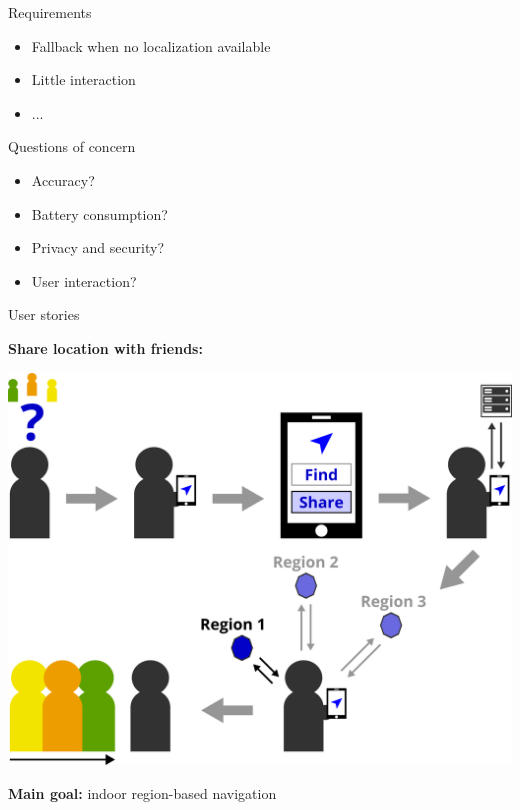 \documentclass[11pt]{beamer}
\begin{document}
\begin{frame}{Requirements}

    \begin{itemize}
    
    	\item Fallback when no localization available
    	\item Little interaction
    	\item ...
    
    \end{itemize}

\end{frame}

\begin{frame}{Questions of concern}

    \begin{itemize}
    
        \item Accuracy?
        \item Battery consumption?
        \item Privacy and security?
        \item User interaction?
        
    \end{itemize}

\end{frame}

\begin{frame}{User stories}
    
    \textbf{Share location with friends:}

	\begin{center}
	
		\includegraphics[width=.6\textwidth]{user-story}
	
	\end{center}
    
    \textbf{Main goal:} indoor region-based navigation

\end{frame}
\end{document}
